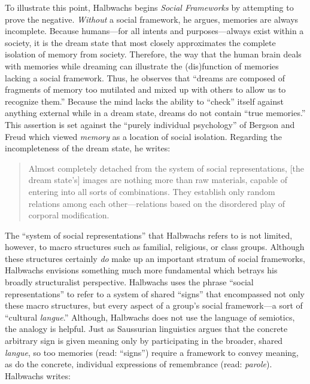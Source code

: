 To illustrate this point, Halbwachs begins \emph{Social Frameworks} by
attempting to prove the negative. \emph{Without} a social framework, he
argues, memories are always incomplete. Because humans---for all intents
and purposes---always exist within a society, it is the dream state that
most closely approximates the complete isolation of memory from society.
Therefore, the way that the human brain deals with memories while
dreaming can illustrate the (dis)function of memories lacking a social
framework. Thus, he observes that ``dreams are composed of fragments of
memory too mutilated and mixed up with others to allow us to recognize
them.''\autocite[41]{halbwachs1992} Because the mind lacks the ability
to ``check'' itself against anything external while in a dream state,
dreams do not contain ``true memories.''\autocite[41]{halbwachs1992}
This assertion is set against the ``purely individual psychology'' of
Bergson and Freud which viewed \emph{memory} as a location of social
isolation.\autocites[See][]{ansellpearson_radstone-schwarz2011}[and][]{terdiman_radstone-schwarz2011}
Regarding the incompleteness of the dream state, he writes:

\begin{quote}
Almost completely detached from the system of social representations,
{[}the dream state's{]} images are nothing more than raw materials,
capable of entering into all sorts of combinations. They establish only
random relations among each other---relations based on the disordered
play of corporal modification.\autocite[42]{halbwachs1992}
\end{quote}

The ``system of social representations'' that Halbwachs refers to is not
limited, however, to macro structures such as familial, religious, or
class groups. Although these structures certainly \emph{do} make up an
important stratum of social frameworks, Halbwachs envisions something
much more fundamental which betrays his broadly structuralist
perspective. Halbwachs uses the phrase ``social representations'' to
refer to a system of shared ``signs'' that encompassed not only these
macro structures, but every aspect of a group's social framework---a
sort of ``cultural \emph{langue}.'' Although, Halbwachs does not use the
language of semiotics, the analogy is helpful. Just as Saussurian
linguistics argues that the concrete arbitrary sign is given meaning
only by participating in the broader, shared \emph{langue}, so too
memories (read: ``signs'') require a framework to convey meaning, as do
the concrete, individual expressions of remembrance (read:
\emph{parole}). Halbwachs writes:

